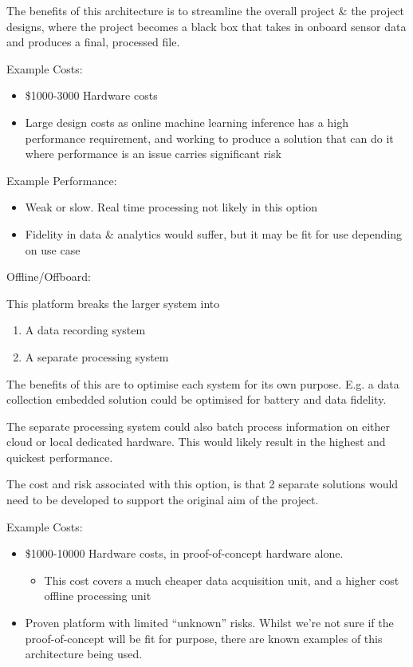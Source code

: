 \documentclass{UoNMCHA}
\numberwithin{equation}{section}
\begin{document}
The benefits of this architecture is to streamline the overall project
\& the project designs, where the project becomes a black box that takes
in onboard sensor data and produces a final, processed file.

{Example Costs:}

\begin{itemize}
\item
  \$1000-3000 Hardware costs
\item
  Large design costs as online machine learning inference has a high
  performance requirement, and working to produce a solution that can do
  it where performance is an issue carries significant risk
\end{itemize}

{Example Performance:}

\begin{itemize}
\item
  Weak or slow. Real time processing not likely in this option
\item
  Fidelity in data \& analytics would suffer, but it may be fit for use
  depending on use case
\end{itemize}

Offline/Offboard:

This platform breaks the larger system into

\begin{enumerate}
\def\labelenumi{\arabic{enumi}.}
\item
  A data recording system
\item
  A separate processing system
\end{enumerate}

The benefits of this are to optimise each system for its own purpose.
E.g. a data collection embedded solution could be optimised for battery
and data fidelity.

The separate processing system could also batch process information on
either cloud or local dedicated hardware. This would likely result in
the highest and quickest performance.

The cost and risk associated with this option, is that 2 separate
solutions would need to be developed to support the original aim of the
project.

{Example Costs:}

\begin{itemize}
\item
  \$1000-10000 Hardware costs, in proof-of-concept hardware alone.

  \begin{itemize}
  \item
    This cost covers a much cheaper data acquisition unit, and a higher
    cost offline processing unit
  \end{itemize}
\item
  Proven platform with limited ``unknown'' risks. Whilst we're not sure
  if the proof-of-concept will be fit for purpose, there are known
  examples of this architecture being used.
\end{itemize}
\end{document}
